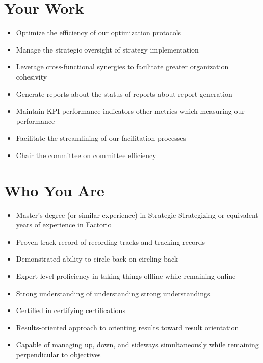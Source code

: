 \documentclass[11pt,a4paper]{article}
\begin{document}
\section*{Your Work}
\begin{itemize}
  \item Optimize the efficiency of our optimization protocols
  \item Manage the strategic oversight of strategy implementation
  \item Leverage cross-functional synergies to facilitate greater organization cohesivity
  \item Generate reports about the status of reports about report generation
  \item Maintain KPI performance indicators other metrics which measuring our performance
  \item Facilitate the streamlining of our facilitation processes
  \item Chair the committee on committee efficiency
\end{itemize}

\section*{Who You Are}
\begin{itemize}
  \item Master's degree (or similar experience) in Strategic Strategizing or equivalent years of experience in Factorio
  \item Proven track record of recording tracks and tracking records
  \item Demonstrated ability to circle back on circling back
  \item Expert-level proficiency in taking things offline while remaining online
  \item Strong understanding of understanding strong understandings
  \item Certified in certifying certifications
  \item Results-oriented approach to orienting results toward result orientation
  \item Capable of managing up, down, and sideways simultaneously while remaining perpendicular to objectives
\end{itemize}
\end{document}
